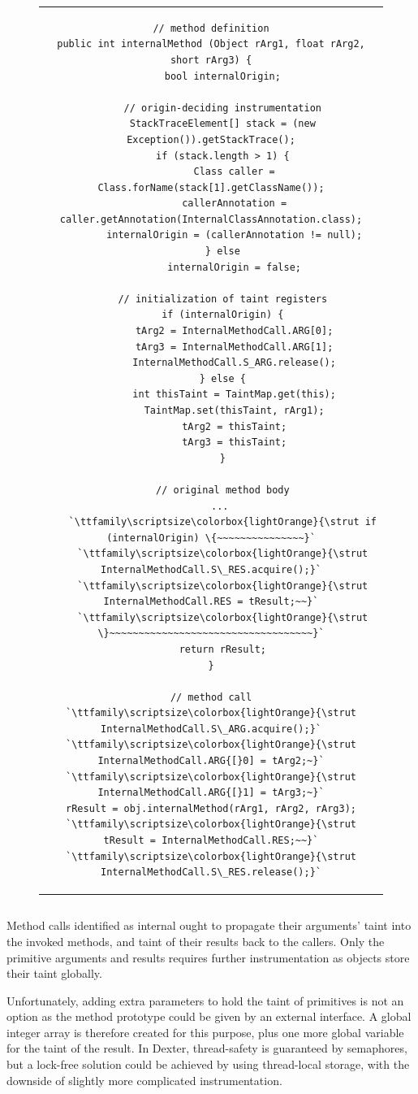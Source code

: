 \documentclass[12pt,twoside,notitlepage]{report}
\newcommand{\highlight}[1]{\colorbox{lightOrange}{\strut #1}}
\newcommand{\lsthl}[1] {\ttfamily\scriptsize\highlight{#1}}
\begin{document}
\begin{figure}
	\centering
	\begin{tabular}{c}
	\begin{lstlisting}
// method definition
public int internalMethod (Object rArg1, float rArg2, short rArg3) {
	bool internalOrigin;

	// origin-deciding instrumentation
	StackTraceElement[] stack = (new Exception()).getStackTrace();
	if (stack.length > 1) {
		Class caller = Class.forName(stack[1].getClassName());
		callerAnnotation = caller.getAnnotation(InternalClassAnnotation.class);
		internalOrigin = (callerAnnotation != null);
	} else
		internalOrigin = false;

	// initialization of taint registers
	if (internalOrigin) {
		tArg2 = InternalMethodCall.ARG[0];
		tArg3 = InternalMethodCall.ARG[1];
		InternalMethodCall.S_ARG.release();
	} else {
		int thisTaint = TaintMap.get(this);
		TaintMap.set(thisTaint, rArg1);
		tArg2 = thisTaint;
		tArg3 = thisTaint;
	}

	// original method body
	... 
	`\lsthl{if (internalOrigin) \{~~~~~~~~~~~~~~~}`
	`\lsthl{	InternalMethodCall.S\_RES.acquire();}`
	`\lsthl{	InternalMethodCall.RES = tResult;~~}`
	`\lsthl{\}~~~~~~~~~~~~~~~~~~~~~~~~~~~~~~~~~~~}`
	return rResult;
}

// method call
`\lsthl{InternalMethodCall.S\_ARG.acquire();}`
`\lsthl{InternalMethodCall.ARG{[}0] = tArg2;~}`
`\lsthl{InternalMethodCall.ARG{[}1] = tArg3;~}`
rResult = obj.internalMethod(rArg1, rArg2, rArg3);
`\lsthl{tResult = InternalMethodCall.RES;~~}`
`\lsthl{InternalMethodCall.S\_RES.release();}`
	\end{lstlisting}
	\end{tabular}
	\begin{lstlisting}[caption={Instrumentation of internal method calls and origin-deciding logic.},
	                   label={listing:TaintPropagation_InternalMethodCall}]
	\end{lstlisting}
\end{figure}

Method calls identified as internal ought to propagate their arguments' taint into the invoked methods, and taint of their results back to the callers. Only the primitive arguments and results requires further instrumentation as objects store their taint globally. 

Unfortunately, adding extra parameters to hold the taint of primitives is not an option as the method prototype could be given by an external interface. A global integer array is therefore created for this purpose, plus one more global variable for the taint of the result. In Dexter, thread-safety is guaranteed by semaphores, but a lock-free solution could be achieved by using thread-local storage, with the downside of slightly more complicated instrumentation.
\end{document}
